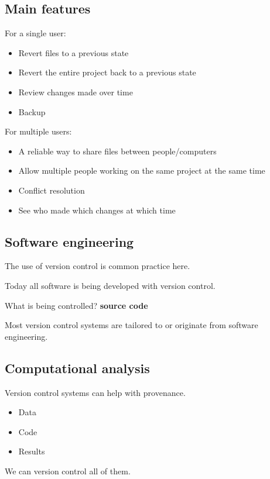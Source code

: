 \documentclass[slidestop]{beamer}
\begin{document}
\subsection{Main features}
\begin{pframe}
  For a single user:
  \begin{itemize}
    \item Revert files to a previous state
    \item Revert the entire project back to a previous state
    \item Review changes made over time
    \item Backup
  \end{itemize}
  \bigskip
  \pause

  For multiple users:
  \begin{itemize}
    \item A reliable way to share files between people/computers
    \item Allow multiple people working on the same project at the same time
    \item Conflict resolution
    \item See who made which changes at which time
  \end{itemize}
\end{pframe}

\subsection{Software engineering}
\begin{pframe}
  The use of version control is common practice here.

  \bigskip
  Today all software is being developed with version control.

  \bigskip
  \pause
  What is being controlled? {\bf source code}

  \bigskip
  Most version control systems are tailored to or originate from software
  engineering.
\end{pframe}

\subsection{Computational analysis}
\begin{pframe}
  Version control systems can help with provenance.

  \bigskip
  \pause
  \begin{itemize}
    \item Data
    \item Code
    \item Results
  \end{itemize}

  We can version control all of them.
\end{pframe}
\end{document}
